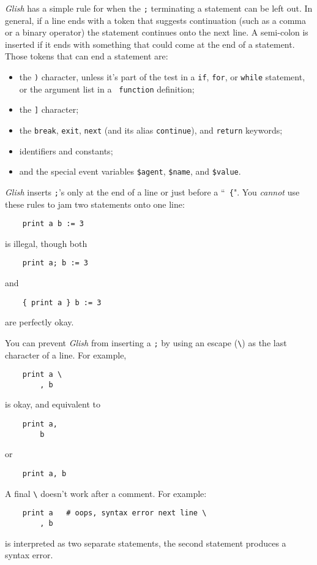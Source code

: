 {\em Glish} has a simple rule for when the {\tt ;} terminating
a statement can be left out.  In general, if a line ends with a
token that suggests continuation (such as a comma or a binary operator)
the statement continues onto the next line.  A semi-colon 
is inserted if it ends with
something that could come at the end of a statement.
Those tokens that can end a statement are:
\begin{itemize}
\item the \verb+)+ character, unless it's part of the test in a {\tt if},
{\tt for}, or {\tt while} statement, or the argument list in a {\tt
function} definition;
\item the \verb+]+ character;
\item the {\tt break}, {\tt exit}, {\tt next} (and its alias {\tt continue}),
and {\tt return} keywords;
\item identifiers and constants;
\item and the special event variables {\tt \$agent}, {\tt \$name},
and {\tt \$value}.
\end{itemize}

{\em Glish} inserts {\tt ;}'s only at the end of a line or just before a ``{\tt
\{}".  You {\em cannot} use these
rules to jam two statements onto one line:
\begin{verbatim}
    print a b := 3
\end{verbatim}
is illegal, though both
\begin{verbatim}
    print a; b := 3
\end{verbatim}
and
\begin{verbatim}
    { print a } b := 3
\end{verbatim}
are perfectly okay.

You can prevent {\em Glish} from inserting a {\tt ;} 
by using an escape (\verb+\+)
as the last character of a line.  For example,
\begin{verbatim}
    print a \
        , b
\end{verbatim}
is okay, and equivalent to
\begin{verbatim}
    print a,
        b
\end{verbatim}
or
\begin{verbatim}
    print a, b
\end{verbatim}
A  final \verb+\+ doesn't work after a comment.  For example:
\begin{verbatim}
    print a   # oops, syntax error next line \
        , b
\end{verbatim}
is interpreted as two separate statements, the second statement produces
a syntax error.
\index{semi-colon!omitting|)}

